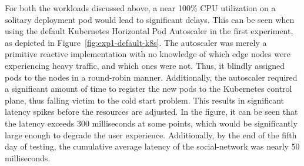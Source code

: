 For both the workloads discussed above, a near 100\% CPU utilization on a solitary deployment pod would lead to significant delays. This can be seen when using the default Kubernetes Horizontal Pod Autoscaler in the first experiment, as depicted in Figure~\ref{fig:exp1-default-k8s}. The autoscaler was merely a primitive reactive implementation with no knowledge of which edge nodes were experiencing heavy traffic, and which ones were not. Thus, it blindly assigned pods to the nodes in a round-robin manner. Additionally, the autoscaler required a significant amount of time to register the new pods to the Kubernetes control plane, thus falling victim to the cold start problem. This results in significant latency spikes before the resources are adjusted. In the figure, it can be seen that the latency exceeds 300 milliseconds at some points, which would be significantly large enough to degrade the user experience. Additionally, by the end of the fifth day of testing, the cumulative average latency of the social-network was nearly 50 milliseconds.\par

\begin{center}
\begin{minipage}{\linewidth}
    \label{fig:exp2-default-k8s}
\end{minipage}
\end{center}

